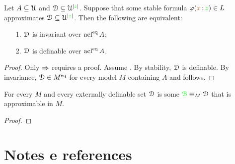 \documentclass[creche.tex]{subfiles}
\begin{document}
\begin{proposition}
Let $A\subseteq\EuScript U$ and $\EuScript D\subseteq\EuScript U^{|{\color{green} z}|}$. Suppose that some stable formula $\varphi({\color{brown} x}\,;{\color{green} z})\in L$ approximates $\EuScript D\subseteq\EuScript U^{|{\color{green} z}|}$. Then the following are equivalent:
\begin{itemize}
\item[1.] $\EuScript D$ is invariant over $\mathop{\rm acl}^{{\rm eq}} A$;
\item[2.] $\EuScript D$ is definable over $\mathop{\rm acl}^{{\rm eq}} A$.
\end{itemize}
\end{proposition}

\begin{proof}
Only $\Rightarrow$ requires a proof. Assume . By stability, $\EuScript D$ is definable. By invariance, $\EuScript D\in M^{{\rm eq}}$ for every model $M$ containing $A$ and  follows.
\end{proof}


\begin{proposition}
For every $M$ and every externally definable set $\EuScript D$ is some ${\color{green}{\EuScript B}}\equiv_M\EuScript D$ that is approximable in $M$. 
\end{proposition}

\begin{proof}

\end{proof}


\section{Notes e references}
\begin{biblist}[]\normalsize







\end{biblist}
\end{document}
